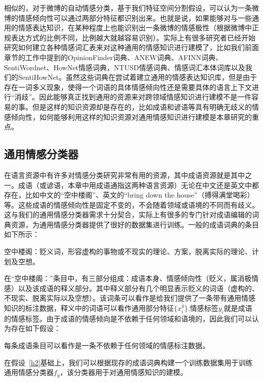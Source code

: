 相似的，对于微博的自动情感分类，基于我们特征空间分割假设，可以认为一条微博的情感倾向性可以通过两部分特征都识别出来。也就是说，如果能够对与一些通用的情感表达知识，在某种程度上也能识别出一条微博的情感极性（根据微博中正规表达方式的比例不同，比例越大就越容易识别）。实际上有很多研究者已经开始研究如何建立各种情感词汇表来对这种通用的情感知识进行建模了，比如我们前面章节的工作中提到的OpinionFinder词典、ANEW词典、AFINN词典、SentiWordnet、HowNet情感词典，NTUSD情感词典、情感词汇本体词库以及我们的SentiHowNet。虽然这些词典在尝试着建立通用的情感表达知识库，但是由于存在一词多义现象，使得一个词语的具体情感倾向性还是需要具体的语言上下文进行“消歧”。因此能够真正找到通用的资源来对跨领域情感知识进行建模不是一件容易的事。但是这样的知识资源却是存在的，比如成语和谚语等具有明确无歧义的情感倾向性，如何能够利用这样的知识资源对通用情感知识进行建模是本章研究的重点。

\subsection{通用情感分类器}
\label{general}
在语言资源中有许多对情感分类研究非常有用的资源，其中成语资源就是其中之一。成语（或谚语，本章中用成语通指这两种语言资源）无论在中文还是英文中都存在，比如中文的“空中楼阁”、英文的``bring down the house''（搏得满堂喝彩）等。这些成语的情感倾向性是固定不变的，不会随着领域或语境的不同而有歧义。这与我们的通用情感分类器需求十分契合，实际上有很多的专门针对成语编辑的词典资源，为通用情感分类器提供了很好的数据集进行训练。一般的成语词典的条目如下所示：
\begin{description}
\item{空中楼阁：}贬义词，形容虚构的事物或不现实的理论、方案，脱离实际的理论、计划及空想。
\end{description}
在“空中楼阁：”条目中，有三部分组成：成语本身、情感倾向性（贬义，属消极情感）以及该成语的释义部分。其中释义部分有几个明显表示贬义的词语（虚构的、不现实、脱离实际以及空想）。该词条可以看作是给我们提供了一条带有通用情感知识的标注数据，释义中的词语可以看作通用部分特征$\{x_i^g\}$,情感标签$y_i$就是成语的情感标签。由于成语的情感倾向是不依赖于任何领域和语境的，因此我们可以认为存在如下假设：

\begin{definition}[假设]
\label{h2}
每条成语条目可以看作是一条不依赖于任何领域的情感标注数据。
\end{definition}
在假设~\ref{h2}基础上，我们可以根据现存的成语词典构建一个训练数据集用于训练通用情感分类器$f_g$，该分类器用于对通用情感知识的建模。


